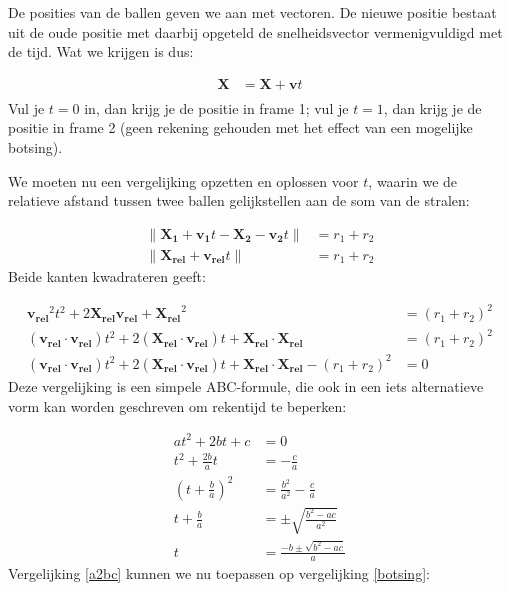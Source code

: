 \documentclass[12pt,a4paper]{article}
\begin{document}
	De posities van de ballen geven we aan met vectoren. De nieuwe positie bestaat uit de oude positie met daarbij opgeteld de snelheidsvector vermenigvuldigd met de tijd. Wat we krijgen is dus:
	
	\begin{equation}
		\begin{aligned}
			\mathbf{X} &= \mathbf{X} + \mathbf{v}t \\
		\end{aligned}
	\end{equation}
	Vul je $t=0$ in, dan krijg je de positie in frame 1; vul je $t=1$, dan krijg je de positie in frame 2 (geen rekening gehouden met het effect van een mogelijke botsing).
	
	We moeten nu een vergelijking opzetten en oplossen voor $t$, waarin we de relatieve afstand tussen twee ballen gelijkstellen aan de som van de stralen:
	
	\begin{equation}
		\begin{aligned}
			 \|\mathbf{X_1} + \mathbf{v_1}t  - \mathbf{X_2} -  \mathbf{v_2}t \| &= r_1 + r_2 \\
			 \|\mathbf{X_{rel}} + \mathbf{v_{rel}}t \| &= r_1 + r_2
		\end{aligned}
	\end{equation}
	Beide kanten kwadrateren geeft:
	
	\begin{equation}
		\label{botsing}
		\begin{aligned}
			\mathbf{v_{rel}}^2 t^2 + 2 \mathbf{X_{rel}} \mathbf{v_{rel}} + \mathbf{X_{rel}}^2  &= (r_1 + r_2)^2 \\
			(\mathbf{v_{rel}} \cdot \mathbf{v_{rel}})t^2 + 2(\mathbf{X_{rel}} \cdot \mathbf{v_{rel}})t + \mathbf{X_{rel}} \cdot \mathbf{X_{rel}} &= (r_1 + r_2)^2 \\
			(\mathbf{v_{rel}} \cdot \mathbf{v_{rel}})t^2 + 2(\mathbf{X_{rel}} \cdot \mathbf{v_{rel}})t + \mathbf{X_{rel}} \cdot \mathbf{X_{rel}} - (r_1 + r_2)^2 &= 0
		\end{aligned}
	\end{equation}
	Deze vergelijking is een simpele ABC-formule, die ook in een iets alternatieve vorm kan worden geschreven om rekentijd te beperken:
	
	\begin{equation}
		\label{a2bc}
		\begin{aligned}
			at^2+2bt+c &= 0 \\
			t^2+\tfrac{2b}{a}t &= -\frac{c}{a} \\
			\left( t+\tfrac{b}{a} \right)^2 &= \frac{b^2}{a^2} -\frac{c}{a} \\
			t + \tfrac{b}{a} &= \pm \sqrt{\frac{b^2 - ac}{a^2}} \\
			t &= \frac{-b \pm \sqrt{b^2 - ac}}{a}
		\end{aligned}
	\end{equation}
	Vergelijking \eqref{a2bc} kunnen we nu toepassen op vergelijking \eqref{botsing}:
	
\end{document}
